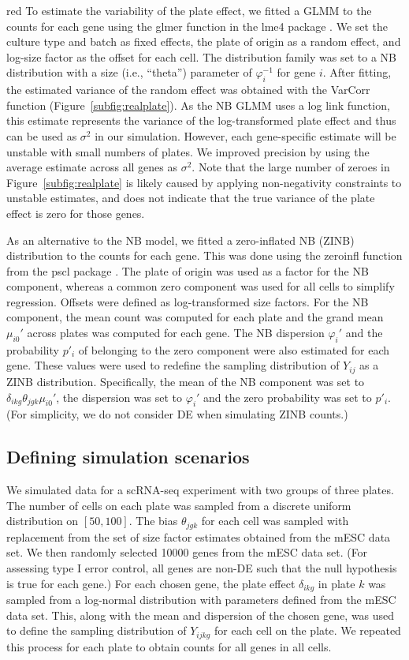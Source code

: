 \documentclass{article}
\begin{document}
\begin{color}{red}
To estimate the variability of the plate effect, we fitted a GLMM to the counts for each gene using the glmer function in the lme4 package \citep{bates2015fitting}.
We set the culture type and batch as fixed effects, the plate of origin as a random effect, and log-size factor as the offset for each cell.
The distribution family was set to a NB distribution with a size (i.e., ``theta'') parameter of $\varphi_i^{-1}$ for gene $i$.
After fitting, the estimated variance of the random effect was obtained with the VarCorr function (Figure~\ref{subfig:realplate}).
As the NB GLMM uses a log link function, this estimate represents the variance of the log-transformed plate effect and thus can be used as $\sigma^2$ in our simulation.
However, each gene-specific estimate will be unstable with small numbers of plates.
We improved precision by using the average estimate across all genes as $\sigma^2$.
Note that the large number of zeroes in Figure~\ref{subfig:realplate} is likely caused by applying non-negativity constraints to unstable estimates, and does not indicate that the true variance of the plate effect is zero for those genes. 

As an alternative to the NB model, we fitted a zero-inflated NB (ZINB) distribution to the counts for each gene.
This was done using the zeroinfl function from the pscl package \citep{zeilis2008regression}.
The plate of origin was used as a factor for the NB component, whereas a common zero component was used for all cells to simplify regression.
Offsets were defined as log-transformed size factors.
For the NB component, the mean count was computed for each plate and the grand mean $\mu_{i0}'$ across plates was computed for each gene.
The NB dispersion $\varphi_i'$ and the probability $p'_i$ of belonging to the zero component were also estimated for each gene.
These values were used to redefine the sampling distribution of $Y_{ij}$ as a ZINB distribution.
Specifically, the mean of the NB component was set to $\delta_{ikg}\theta_{jgk}\mu_{i0}'$, the dispersion was set to $\varphi_i'$ and the zero probability was set to $p'_i$.
(For simplicity, we do not consider DE when simulating ZINB counts.)

\subsection{Defining simulation scenarios}
We simulated data for a scRNA-seq experiment with two groups of three plates.
The number of cells on each plate was sampled from a discrete uniform distribution on $[50, 100]$.
The bias $\theta_{jgk}$ for each cell was sampled with replacement from the set of size factor estimates obtained from the mESC data set.
We then randomly selected 10000 genes from the mESC data set.
(For assessing type I error control, all genes are non-DE such that the null hypothesis is true for each gene.)
For each chosen gene, the plate effect $\delta_{ikg}$ in plate $k$ was sampled from a log-normal distribution with parameters defined from the mESC data set.
This, along with the mean and dispersion of the chosen gene, was used to define the sampling distribution of $Y_{ijkg}$ for each cell on the plate.
We repeated this process for each plate to obtain counts for all genes in all cells.


\end{color}
\end{document}
